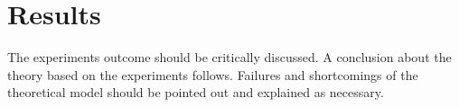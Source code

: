 \chapter{Results}

The experiments outcome should be critically discussed. A conclusion about the theory based on the experiments follows. Failures and shortcomings of the theoretical model should be pointed out and explained as necessary.